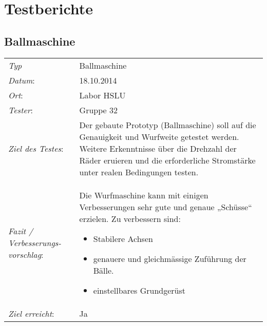 \section{Testberichte}
\subsection{Ballmaschine}
\begin{tabular}{p{3.6cm}p{9.4cm}}
\textit{Typ}              & Ballmaschine \\ 
\textit{Datum}:           & 18.10.2014   \\
\textit{Ort}:             & Labor HSLU \\
\textit{Tester}:          & Gruppe 32 \\
\textit{Ziel des Testes}: & Der gebaute Prototyp (Ballmaschine) soll auf die Genauigkeit und Wurfweite getestet werden. Weitere Erkenntnisse über die Drehzahl der Räder eruieren und die erforderliche Stromstärke unter realen Bedingungen testen.  \\
\textit{Fazit / Verbesserungs-\newline vorschlag}: & Die Wurfmaschine kann mit einigen Verbesserungen sehr gute und genaue „Schüsse“ erzielen. Zu verbessern sind:
\begin{itemize}
    \item Stabilere Achsen
    \item genauere und gleichmässige Zuführung der Bälle.
    \item einstellbares Grundgerüst
\end{itemize}\\
\textit{Ziel erreicht}:& Ja\\
\end{tabular}
